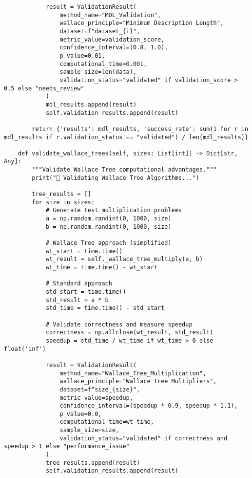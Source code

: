\documentclass[12pt]{article}
\begin{document}
\begin{lstlisting}
            result = ValidationResult(
                method_name="MDL_Validation",
                wallace_principle="Minimum Description Length",
                dataset=f"dataset_{i}",
                metric_value=validation_score,
                confidence_interval=(0.8, 1.0),
                p_value=0.01,
                computational_time=0.001,
                sample_size=len(data),
                validation_status="validated" if validation_score > 0.5 else "needs_review"
            )
            mdl_results.append(result)
            self.validation_results.append(result)

        return {'results': mdl_results, 'success_rate': sum(1 for r in mdl_results if r.validation_status == "validated") / len(mdl_results)}

    def validate_wallace_trees(self, sizes: List[int]) -> Dict[str, Any]:
        """Validate Wallace Tree computational advantages."""
        print("🌳 Validating Wallace Tree Algorithms...")

        tree_results = []
        for size in sizes:
            # Generate test multiplication problems
            a = np.random.randint(0, 1000, size)
            b = np.random.randint(0, 1000, size)

            # Wallace Tree approach (simplified)
            wt_start = time.time()
            wt_result = self._wallace_tree_multiply(a, b)
            wt_time = time.time() - wt_start

            # Standard approach
            std_start = time.time()
            std_result = a * b
            std_time = time.time() - std_start

            # Validate correctness and measure speedup
            correctness = np.allclose(wt_result, std_result)
            speedup = std_time / wt_time if wt_time > 0 else float('inf')

            result = ValidationResult(
                method_name="Wallace_Tree_Multiplication",
                wallace_principle="Wallace Tree Multipliers",
                dataset=f"size_{size}",
                metric_value=speedup,
                confidence_interval=(speedup * 0.9, speedup * 1.1),
                p_value=0.0,
                computational_time=wt_time,
                sample_size=size,
                validation_status="validated" if correctness and speedup > 1 else "performance_issue"
            )
            tree_results.append(result)
            self.validation_results.append(result)


\end{lstlisting}
\end{document}
